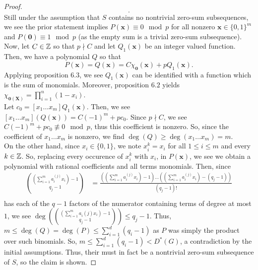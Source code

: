 \begin{proof}
\[		.\]
		Still under the assumption that \(S\) contains no  nontrivial zero-sum subsequences, we see the prior statement implies \(P\left( \textbf{x} \right) \equiv 0 \mod p\) for all nonzero \(\textbf{x} \in \{0, 1\} ^{m}\) and \(P\left( \textbf{0} \right) \equiv 1 \mod p \) (as the empty sum is a trivial zero-sum subsequence).\\
		Now, let \(C \in \mathbb{Z}\) so that \(p \nmid C\) and let \(Q_{1}\left( \textbf{x} \right) \) be an integer valued function. Then, we have a polynomial \(Q\) so that \[
			P\left( \textbf{x} \right)  = Q\left( \textbf{x} \right) = C \chi_{\textbf{0}}\left( \textbf{x} \right)  + pQ_1\left( \textbf{x} \right)
		.\]
		Applying proposition \(6.3\), we see \(Q_1\left(\textbf{x}  \right) \) can be identified with a function which is the sum of monomials. Moreover, proposition \(6.2\) yields \(\chi_{\textbf{0}\left( \textbf{X} \right) } = \prod_{i= 1}^{n} \left( 1-x_{i} \right) \).\\
		Let \(c_0 = \left[ x_1 \ldots x_{m} \right]Q_1\left( \textbf{x} \right)  \). Then, we see \(\left[ x_1\ldots x_{m} \right]\left( Q\left( \textbf{x} \right)  \right) = C\left( -1 \right) ^{m} + p c_0  \). Since \(p\nmid C\), we see \(C\left( -1 \right) ^{m} + pc_0 \not \equiv 0 \mod p\), thus this coefficient is nonzero. So, since the coefficient of \(x_1 \ldots x_{m}\) is nonzero, we find \(\deg \left( Q \right) \ge \deg \left( x_1 \ldots x_{m} \right) = m\).\\
		On the other hand, since \(x_{i} \in \{0, 1\} \), we note \(x_{i}^{k} = x_{i}\) for all \(1 \le i \le m\) and every \(k \in \mathbb{Z}\). So, replacing every occurence of \(x_{i}^{k}\) with \(x_{i}\), in \(P\left( \textbf{x} \right) \), we see we obtain a polynomial with rational coefficients and all terms monomials. Then, since \begin{align*}
			\binom{\left( \sum_{i= 1}^{m} a_{i}^{\left( j \right) }x_{i} \right) -1}{q_{j}-1} &= \frac{\left( \left( \sum_{i= 1}^{m} a_{i}^{\left(j  \right) }x_{i} \right) - 1  \right) \ldots \left( \left( \sum_{i= 1}^{m} a_{i}^{\left( j \right)} x_{i}  \right) - \left( q_{j} - 1 \right)   \right)  }{\left( q_{j}-1 \right) !}\\
		\end{align*}
		has each of the \(q-1\) factors of the numerator containing terms of degree at most \(1\), we see \(\deg \left( \binom{\left( \sum_{i= 1}^{m} a_{i}^{}\left( j \right) x_{i} \right) - 1 }{q_{j}-1} \right) \le q_{j} - 1 \). Thus, \(m \le \deg \left( Q \right) = \deg \left( P \right) \le \sum_{i= 1}^{d} \left( q_{i} - 1 \right) \) as \(P\) was simply the product over such binomials. So, \(m \le \sum_{i= 1}^{d} \left( q_{i} - 1 \right) < D^{*}\left( G \right) \), a contradiction by the initial assumptions. Thus, their must in fact be a nontrivial zero-sum subsequence of \(S\), so the claim is shown.
\end{proof}
